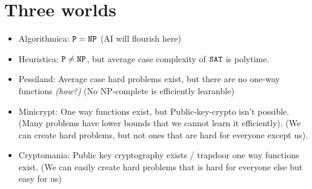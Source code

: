 \section{Three worlds}
\begin{itemize}
\item Algorithmica: $\texttt{P} = \texttt{NP}$ (AI will flourish here)
\item Heuristica: $\texttt{P} \neq \texttt{NP}$, but average case complexity of $\texttt{SAT}$ is polytime.
\item Pessiland: Average case hard problems exist, but there are no one-way functions \textit{(how?)}
(No NP-complete is efficiently learanble)

\item Minicrypt: One way functions exist, but Public-key-crypto isn't possible.
    (Many problems have lower bounds that we cannot learn it efficiently).
    (We can create hard problems, but not ones that are hard for everyone except us).

\item Cryptomania: Public key cryptography exists / trapdoor one way functions exist.
(We can easily create hard problems that is hard for everyone else but easy for us)
\end{itemize}

